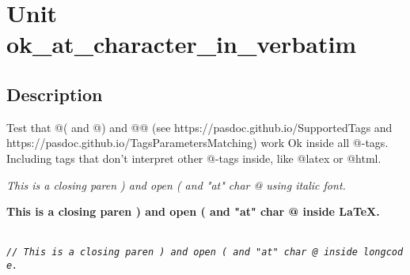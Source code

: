 \documentclass{report}
\begin{document}
\newlength{\tmplength}
\chapter{Unit ok{\_}at{\_}character{\_}in{\_}verbatim}
\section{Description}
Test that @( and @) and @@ (see https://pasdoc.github.io/SupportedTags and https://pasdoc.github.io/TagsParametersMatching) work Ok inside all @{-}tags. Including tags that don't interpret other @{-}tags inside, like @latex or @html.

\textit{This is a closing paren ) and open ( and "at" char @ using italic font.}

{\bf This is a closing paren ) and open ( and "at" char @ inside LaTeX.}



\texttt{\\\nopagebreak[3]
\textit{//~This~is~a~closing~paren~)~and~open~(~and~"at"~char~@~inside~longcode.}\\
}
\end{document}
